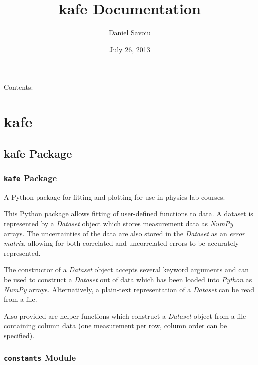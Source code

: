\documentclass[letterpaper,10pt,english]{sphinxmanual}
\title{kafe Documentation}
\date{July 26, 2013}
\author{Daniel Savoiu}
\begin{document}
\maketitle
\tableofcontents
{}\label{index::doc}


Contents:


\chapter{kafe}
\label{api/modules:kafe}\label{api/modules::doc}\label{api/modules:welcome-to-kafe-s-documentation}

\section{kafe Package}
\label{api/kafe:kafe-package}\label{api/kafe::doc}

\subsection{\texttt{kafe} Package}
\label{api/kafe:id1}\label{api/kafe:module-kafe.__init__}
A Python package for fitting and plotting for use in physics lab courses.

This Python package allows fitting of user-defined functions to data. A dataset is
represented by a \emph{Dataset} object which stores measurement data as \emph{NumPy} arrays.
The uncertainties of the data are also stored in the \emph{Dataset} as an \emph{error matrix},
allowing for both correlated and uncorrelated errors to be accurately represented.

The constructor of a \emph{Dataset} object accepts several keyword arguments and can be used
to construct a \emph{Dataset} out of data which has been loaded into \emph{Python} as \emph{NumPy} arrays.
Alternatively, a plain-text representation of a \emph{Dataset} can be read from a file.

Also provided are helper functions which construct a \emph{Dataset} object from a
file containing column data (one measurement per row, column order can be specified).


\subsection{\texttt{constants} Module}
\label{api/kafe:constants-module}\label{api/kafe:module-kafe.constants}\label{api/kafe:module-constants}
\end{document}
